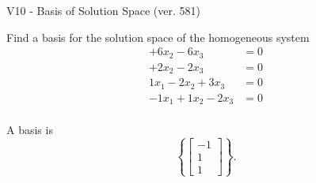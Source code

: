 \begin{exercise}
  \begin{exerciseTitle}V10 - Basis of Solution Space (ver. 581)\end{exerciseTitle}
  \begin{exerciseStatement}
    Find a basis for the solution space of the homogeneous system 
\begin{align*}
 + 6 x_ 2 -6 x_ 3 &= 0  \\ 
  + 2 x_ 2 -2 x_ 3 &= 0  \\ 
  1 x_ 1 -2 x_ 2 + 3 x_ 3 &= 0  \\ 
  -1 x_ 1 + 1 x_ 2 -2 x_ 3 &= 0  \\ 
 \end{align*}


 
  \end{exerciseStatement}

  \begin{exerciseAnswer}
   A basis is   
\[\left\{\left[\begin{array}{c}
-1 \\
1 \\
1
\end{array}\right]\right\}.\]

  


  \end{exerciseAnswer}
\end{exercise}